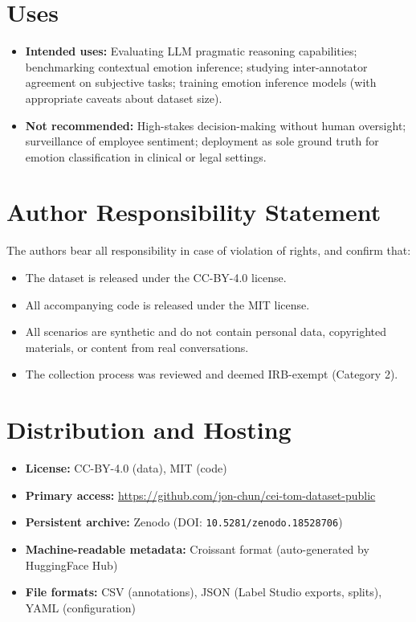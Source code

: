 \documentclass[11pt]{article}
\begin{document}
\section{Uses}

\begin{itemize}[leftmargin=*]
    \item \textbf{Intended uses:} Evaluating LLM pragmatic reasoning capabilities; benchmarking contextual emotion inference; studying inter-annotator agreement on subjective tasks; training emotion inference models (with appropriate caveats about dataset size).
    \item \textbf{Not recommended:} High-stakes decision-making without human oversight; surveillance of employee sentiment; deployment as sole ground truth for emotion classification in clinical or legal settings.
\end{itemize}

\section{Author Responsibility Statement}

The authors bear all responsibility in case of violation of rights, and confirm that:
\begin{itemize}[leftmargin=*]
    \item The dataset is released under the CC-BY-4.0 license.
    \item All accompanying code is released under the MIT license.
    \item All scenarios are synthetic and do not contain personal data, copyrighted materials, or content from real conversations.
    \item The collection process was reviewed and deemed IRB-exempt (Category 2).
\end{itemize}

\section{Distribution and Hosting}

\begin{itemize}[leftmargin=*]
    \item \textbf{License:} CC-BY-4.0 (data), MIT (code)
    \item \textbf{Primary access:} \url{https://github.com/jon-chun/cei-tom-dataset-public}
    \item \textbf{Persistent archive:} Zenodo (DOI: \texttt{10.5281/zenodo.18528706})
    \item \textbf{Machine-readable metadata:} Croissant format (auto-generated by HuggingFace Hub)
    \item \textbf{File formats:} CSV (annotations), JSON (Label Studio exports, splits), YAML (configuration)
\end{itemize}
\end{document}
